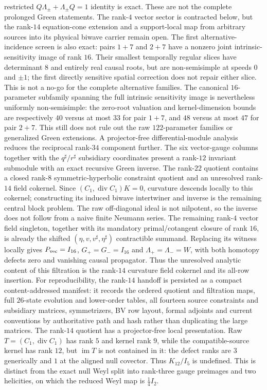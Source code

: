 \documentclass[11pt]{article}
\theoremstyle{definition}
\theoremstyle{remark}
\begin{document}
restricted $Q\Lambda_\pm+\Lambda_\pm Q=1$ identity is exact.  These are not
the complete prolonged Green statements.  The rank-$4$ vector sector is
contracted below, but the rank-$14$ equation-cone extension and a
support-local map from arbitrary sources into its physical biwave carrier
remain open.
The first alternative-incidence screen is also exact: pairs $1+7$ and
$2+7$ have a nonzero joint intrinsic-sensitivity image of rank $16$.
Their smallest temporally regular slices have determinant $8$ and entirely
real causal roots, but are non-semisimple at speeds $0$ and $\pm1$; the first
directly sensitive spatial correction does not repair either slice.  This is
not a no-go for the complete alternative families.
The canonical $16$-parameter subfamily spanning the full intrinsic
sensitivity image is nevertheless uniformly non-semisimple: the zero-root
valuation and kernel-dimension bounds are respectively $40$ versus at most
$33$ for pair $1+7$, and $48$ versus at most $47$ for pair $2+7$.  This
still does not rule out the raw $122$-parameter families or generalized
Green extensions.
A projector-free differential-module analysis reduces the reciprocal
rank-$34$ component further.  The six vector-gauge columns together with the
$q^\sharp/r^\sharp$ subsidiary coordinates present a rank-$12$ invariant
submodule with an exact recursive Green inverse.  The rank-$22$ quotient
contains a closed rank-$8$ symmetric-hyperbolic constraint quotient and an
unresolved rank-$14$ field cokernel.  Since
$(C_1,\operatorname{div}C_1)K=0$, curvature descends locally to this
cokernel; constructing its induced biwave intertwiner and inverse is the
remaining central block problem.  The raw off-diagonal ideal is not
nilpotent, so the inverse does not follow from a naive finite Neumann series.
The remaining rank-$4$ vector field singleton, together with its mandatory
primal/cotangent closure of rank $16$, is already the shifted
$(\eta,v,v^\sharp,\eta^\sharp)$ contractible summand.  Replacing its witness
locally gives $P_{\rm vec}=I_{16}$, $G_+=G_-=I_{16}$ and
$\Lambda_+=\Lambda_-=W$, with both homotopy defects zero and vanishing causal
propagator.  Thus the unresolved analytic content of this filtration is the
rank-$14$ curvature field cokernel and its all-row insertion.
For reproducibility, the rank-$14$ handoff is persisted as a compact
content-addressed manifest: it records the ordered quotient and filtration
maps, full $26$-state evolution and lower-order tables, all fourteen source
constraints and subsidiary matrices, symmetrizers, BV row layout, formal
adjoints and current conventions by authoritative path and hash rather than
duplicating the large matrices.
The rank-$14$ quotient has a projector-free local presentation.  Raw
$T=(C_1,\operatorname{div}C_1)$ has rank $5$ and kernel rank $9$, while the
compatible-source kernel has rank $12$, but $\operatorname{im}T$ is not
contained in it: the defect ranks are $3$ generically and $1$ at the aligned
null covector.  Thus $K_{12}/I_5$ is undefined.  This is distinct from the
exact null Weyl split into rank-three gauge preimages and two helicities, on
which the reduced Weyl map is $\frac14I_2$.
\end{document}
